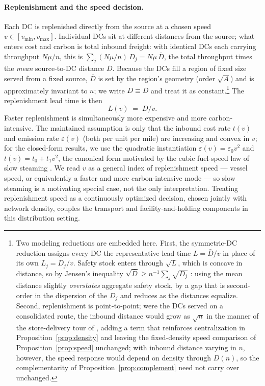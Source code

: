 \documentclass[11pt]{article}
\theoremstyle{definition}
\theoremstyle{remark}
\theoremstyle{plain}
\begin{document}
\paragraph{Replenishment and the speed decision.} Each DC is replenished directly from the source at a chosen
speed $v \in [v_{\min}, v_{\max}]$. Individual DCs sit at different distances from the source; what enters
cost and carbon is total inbound freight: with identical DCs each carrying throughput $N\mu/n$, this is
$\sum_j (N\mu/n)\,D_j = N\mu\,\bar D$, the total throughput times the \emph{mean} source-to-DC distance
$\bar D$. Because the DCs fill a region of fixed
size served from a fixed source, $\bar D$ is set by the region's geometry (order $\sqrt A$) and is
approximately invariant to $n$; we write $D \equiv \bar D$ and treat it as constant.\footnote{Two
modeling reductions are embedded here. First, the symmetric-DC reduction assigns every DC the representative lead
time $L = \bar D/v$ in place of its own $L_j = D_j/v$. Safety stock enters through $\sqrt{L}$, which is
concave in distance, so by Jensen's inequality $\sqrt{\bar D} \ge n^{-1}\sum_j \sqrt{D_j}$
\citep{jensen1906fonctions}: using the mean distance slightly \emph{overstates} aggregate safety stock, by a
gap that is second-order in the dispersion of the $D_j$ and reduces as the distances equalize. Second, replenishment is
point-to-point; were the DCs served on a consolidated route, the inbound distance would grow as $\sqrt{n}$ in
the manner of the store-delivery tour of \citet{cachon2014retail}, adding a term that reinforces centralization
in Proposition~\ref{prop:density} and leaving the fixed-density speed comparison of
Proposition~\ref{prop:speed} unchanged; with inbound distance varying in $n$, however, the speed response
would depend on density through $D(n)$, so the complementarity of Proposition~\ref{prop:complement} need not
carry over unchanged.}
The replenishment lead time is then
\begin{equation}\label{eq:lead}
  L(v) \;=\; D/v .
\end{equation}
Faster replenishment is simultaneously more expensive and more carbon-intensive. The maintained assumption
is only that the inbound cost rate $t(v)$ and emission rate $\varepsilon(v)$ (both per unit per mile) are
increasing and convex in $v$; for the closed-form results, we use the quadratic instantiation
$\varepsilon(v)=\varepsilon_0 v^2$ and $t(v)=t_0+t_1 v^2$, the canonical form motivated by the cubic
fuel-speed law of slow steaming \citep{psaraftis2013speed, cariou2011slow}. We read $v$ as a general index
of replenishment speed --- vessel speed, or equivalently a faster and more carbon-intensive mode --- so
slow steaming is a motivating special case, not the only interpretation. Treating replenishment speed as a
continuously optimized decision, chosen jointly with network density, couples the transport and facility-and-holding components in this distribution setting.
\end{document}
